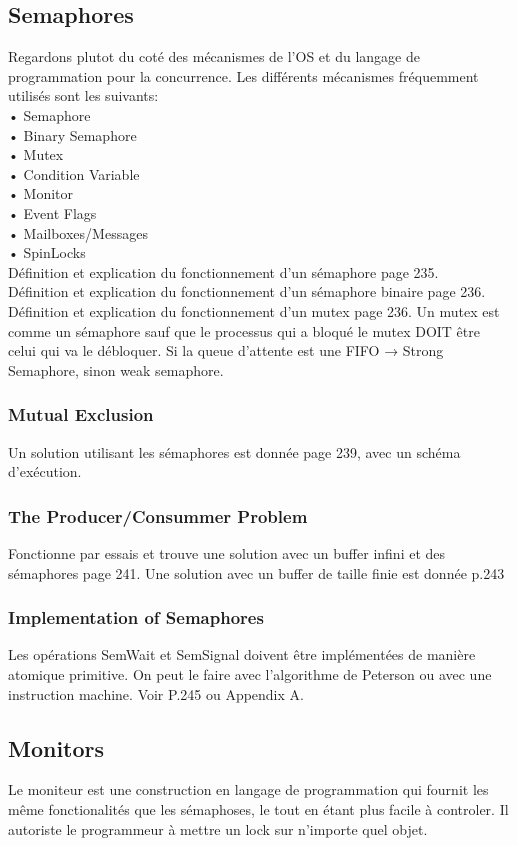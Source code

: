 \subsection{Semaphores}
Regardons plutot du coté des mécanismes de l’OS et du langage de programmation pour la concurrence. Les différents mécanismes fréquemment utilisés sont les suivants: \\
• Semaphore \\
• Binary Semaphore \\
• Mutex \\
• Condition Variable \\
• Monitor \\
• Event Flags \\
• Mailboxes/Messages \\
• SpinLocks \\
Définition et explication du fonctionnement d’un sémaphore page 235. \\
Définition et explication du fonctionnement d’un sémaphore binaire page 236. Définition et explication du fonctionnement d’un mutex page 236. Un mutex est comme un sémaphore sauf que le processus qui a bloqué le mutex DOIT être celui qui va le débloquer.
Si la queue d’attente est une FIFO → Strong Semaphore, sinon weak semaphore.
\subsubsection{Mutual Exclusion}
Un solution utilisant les sémaphores est donnée page 239, avec un schéma d’exécution.
\subsubsection{The Producer/Consummer Problem}
Fonctionne par essais et trouve une solution avec un buffer infini et des sémaphores page 241.
Une solution avec un buffer de taille finie est donnée p.243
\subsubsection{Implementation of Semaphores}
Les opérations SemWait et SemSignal doivent être implémentées de manière atomique primitive. On peut le faire avec l’algorithme de Peterson ou avec une instruction machine. Voir P.245 ou Appendix A.
\subsection{Monitors}
Le moniteur est une construction en langage de programmation qui fournit les même fonctionalités que les sémaphoses, le tout en étant plus facile à controler. Il autoriste le programmeur à mettre un lock sur n’importe quel objet.
